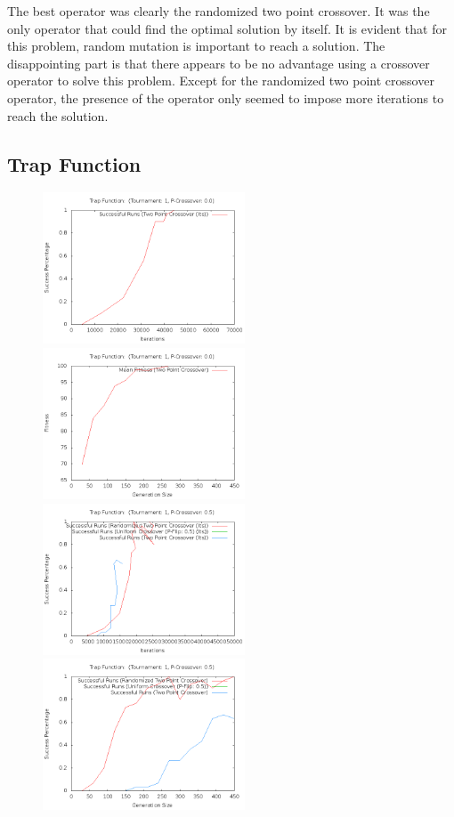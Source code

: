 \documentclass[10pt]{article}
\begin{document}
The best operator was clearly the randomized two point crossover. It was the only operator that could find the optimal solution by itself. It is evident that for this problem, random mutation is important to reach a solution. The disappointing part is that there appears to be no advantage using a crossover operator to solve this problem. Except for the randomized two point crossover operator, the presence of the operator only seemed to impose more iterations to reach the solution.
\pagebreak
\subsection{Trap Function}

\begin{figure}[h!]
  \centering
    \includegraphics[height=170px]{img/TrapFunctionRandomIters.png}
    \includegraphics[height=170px]{img/TrapFunctionRandomGens.png}
    \includegraphics[height=170px]{img/TrapFunctionBothIters.png}
    \includegraphics[height=170px]{img/TrapFunctionBothGens.png}

\end{figure}
\end{document}
